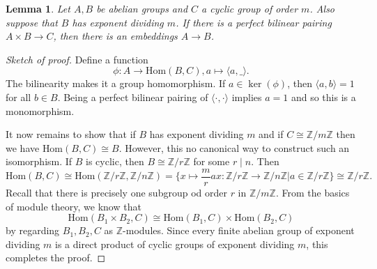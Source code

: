 \documentclass[12pt]{report}
\newtheorem{lemma}[theorem]{Lemma}
\theoremstyle{definition}
\newcommand{\zz}{\mathbb{Z}}
\newcommand{\ta}[1]{\langle #1 \rangle}
\newcommand{\Hom}{\text{Hom}}
\begin{document}
\begin{lemma}
	Let $A,B$ be abelian groups and $C$ a cyclic group of order $m$. Also suppose that $B$ has exponent dividing $m$. If there is a perfect bilinear pairing $A\times B\to C$, then there is an embeddings $A\to B$.
\end{lemma}

\begin{proof}[Sketch of proof]
	Define a function $$\phi:A\to \Hom(B,C), a\mapsto \ta{a,\_}.$$ The bilinearity makes it a group homomorphism. If $a\in\ker(\phi)$, then $\ta{a,b}=1$ for all $b\in B$. Being a perfect bilinear pairing of $\ta{\cdot,\cdot}$ implies $a=1$ and so this is a monomorphism.

	It now remains to show that if $B$ has exponent dividing $m$ and if $C\cong \zz/m\zz$ then we have $\Hom(B,C)\cong B$. However, this no canonical way to construct such an isomorphism. If $B$ is cyclic, then $B\cong \zz/r\zz$ for some $r\mid n$. Then $$\Hom(B,C)\cong\Hom(\zz/r\zz,\zz/n\zz)=\{x\mapsto \frac{m}{r}ax:\zz/r\zz\to\zz/n\zz | a\in \zz/r\zz \}\cong\zz/r\zz.$$ Recall that there is precisely one subgroup od order $r$ in $\zz/m\zz$. From the basics of module theory, we know that $$\Hom(B_1\times B_2, C)\cong \Hom(B_1,C)\times\Hom(B_2,C)$$ by regarding $B_1,B_2,C$ as $\zz$-modules. Since every finite abelian group of exponent dividing $m$ is a direct product of cyclic groups of exponent dividing $m$, this completes the proof.
\end{proof}
\end{document}
